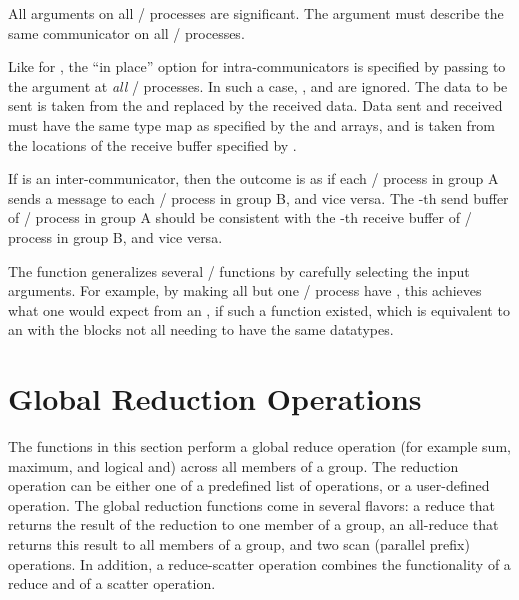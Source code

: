 All arguments on all \MPI/ processes are significant.  The argument
 must describe the same communicator on all \MPI/ processes.

Like for , the ``in place'' option for intra-communicators
is specified by passing  to the argument 
at \emph{all} \MPI/ processes.
In such a case, ,  and  are ignored.
The data to be sent is taken from the  and replaced by the received data.
Data sent and received must have the same type map as specified by the 
and  arrays, and is taken from the locations of the receive buffer
specified by .

If  is an inter-communicator, then the outcome is as if
each \MPI/ process in group A sends a message to each \MPI/ process in group B,
and vice versa.  The -th send buffer of \MPI/ process  in group A should
be consistent with the -th receive buffer of \MPI/ process  in group B,
and vice versa.


\begin{rationale}
The  function generalizes several \MPI/ functions by
carefully selecting the input arguments.  For example, by making all but one
\MPI/ process have , 
this achieves what one would expect from an , if such a function existed, which is equivalent to an  with the blocks not all needing to have the same datatypes. 
\end{rationale}

\section{Global Reduction Operations}
\label{global-reduce}

The functions in this section perform a global reduce operation
(for example sum, maximum, and logical and) across
all members of a group.
The reduction operation can be either one of a predefined list of
operations, or a user-defined operation.
The global reduction functions come in several flavors: a reduce that
returns the result of the reduction
to one member of a group,
an all-reduce that
returns this result
to all members of a group,
and
two
scan (parallel prefix)
operations.
In addition, a reduce-scatter operation combines the
functionality of a reduce and of a scatter operation.


